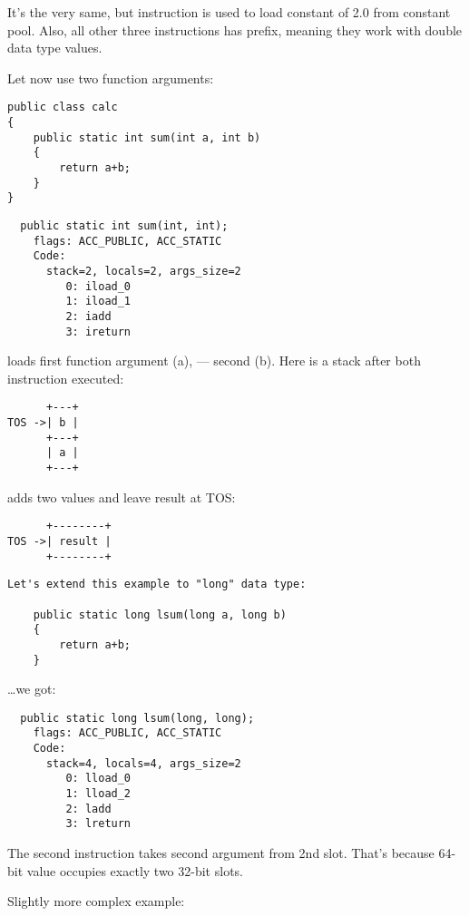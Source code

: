 It's the very same, but  instruction is used to load constant of 2.0 from constant pool.
Also, all other three instructions has  prefix, 
meaning they work with double data type values.

Let now use two function arguments:

\begin{lstlisting}
public class calc
{
	public static int sum(int a, int b)
	{
		return a+b;
	}
}
\end{lstlisting}

\begin{lstlisting}
  public static int sum(int, int);
    flags: ACC_PUBLIC, ACC_STATIC
    Code:
      stack=2, locals=2, args_size=2
         0: iload_0       
         1: iload_1       
         2: iadd          
         3: ireturn       
\end{lstlisting}

 loads first function argument (a),  --- second (b).
Here is a stack after both instruction executed:

\begin{lstlisting}
      +---+
TOS ->| b |
      +---+
      | a |
      +---+
\end{lstlisting}

 adds two values and leave result at \ac{TOS}:

\begin{lstlisting}
      +--------+
TOS ->| result |
      +--------+
\end{lstlisting}

\begin{lstlisting}
Let's extend this example to "long" data type:

	public static long lsum(long a, long b)
	{
		return a+b;
	}
\end{lstlisting}

\dots we got:

\begin{lstlisting}
  public static long lsum(long, long);
    flags: ACC_PUBLIC, ACC_STATIC
    Code:
      stack=4, locals=4, args_size=2
         0: lload_0       
         1: lload_2       
         2: ladd          
         3: lreturn       
\end{lstlisting}

The second  instruction takes second argument from 2nd slot.
That's because 64-bit  value occupies exactly two 32-bit slots.

Slightly more complex example:


